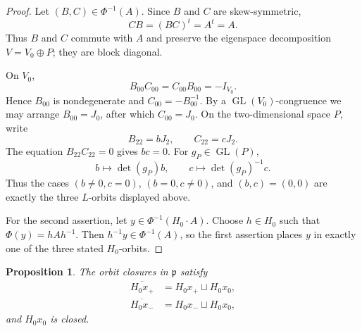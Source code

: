 \documentclass[11pt,reqno]{amsart}
\numberwithin{equation}{section}
\newtheorem{proposition}[theorem]{Proposition}
\theoremstyle{definition}
\theoremstyle{remark}
\newcommand{\GL}{\operatorname{GL}}
\newcommand{\fp}{\mathfrak p}
\begin{document}
\begin{proof}
Let $(B,C)\in\Phi^{-1}(A)$.  Since $B$ and $C$ are skew-symmetric,
\[
  CB=(BC)^t=A^t=A.
\]
Thus $B$ and $C$ commute with $A$ and preserve the eigenspace decomposition
$V=V_0\oplus P$; they are block diagonal.

On $V_0$,
\[
  B_{00}C_{00}=C_{00}B_{00}=-I_{V_0}.
\]
Hence $B_{00}$ is nondegenerate and $C_{00}=-B_{00}^{-1}$.  By a
$\GL(V_0)$-congruence we may arrange $B_{00}=J_0$, after which
$C_{00}=J_0$.  On the two-dimensional space $P$, write
\[
  B_{22}=bJ_2,\qquad C_{22}=cJ_2.
\]
The equation $B_{22}C_{22}=0$ gives $bc=0$.  For $g_P\in\GL(P)$,
\[
  b\longmapsto\det(g_P)b,
  \qquad
  c\longmapsto\det(g_P)^{-1}c.
\]
Thus the cases $(b\ne0,c=0)$, $(b=0,c\ne0)$, and $(b,c)=(0,0)$ are exactly the three $L$-orbits displayed above.

For the second assertion, let $y\in\Phi^{-1}(H_0\cdot A)$.  Choose
$h\in H_0$ such that $\Phi(y)=hAh^{-1}$.  Then
$h^{-1}y\in\Phi^{-1}(A)$, so the first assertion places $y$ in exactly one of the three stated $H_0$-orbits.
\end{proof}

\begin{proposition}\label{diii:prop:closures}
The orbit closures in $\fp$ satisfy
\begin{align}
 \overline{H_0x_+}&=H_0x_+\sqcup H_0x_0,\label{diii:eq:clplus}\\
 \overline{H_0x_-}&=H_0x_-\sqcup H_0x_0,\label{diii:eq:clminus}
\end{align}
and $H_0x_0$ is closed.
\end{proposition}
\end{document}
